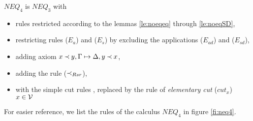 \begin{DEFINITION}\label{de:neq4}
$NEQ_4$ is $NEQ_3$ with 
\begin{itemize}\MyLPar
\item rules restricted
according to the lemmas \ref{le:noeqeq} through \ref{le:noeqSD}, %
\item restricting rules ($E_a$) and ($E_s$) by excluding the applications ($E_{ad}$)
and ($E_{sd}$),
\item adding axiom $x\mathbin{\prec} y,\Gamma\mathrel{\mapsto}\Delta, y\mathbin{\prec} x$,
\item adding the rule ($\mathbin{\prec}_{Rsr}$),
\item
with the simple cut rules ,  
replaced by the rule of {\em elementary cut}
 ($cut_x$)\ \
\ $x\in{\cal V}$ \label{ru:cutx} 
\end{itemize}
\end{DEFINITION}
%
\noindent
For easier reference, we list the rules of the calculus $NEQ_4$ in figure
\ref{fi:neq4}.

